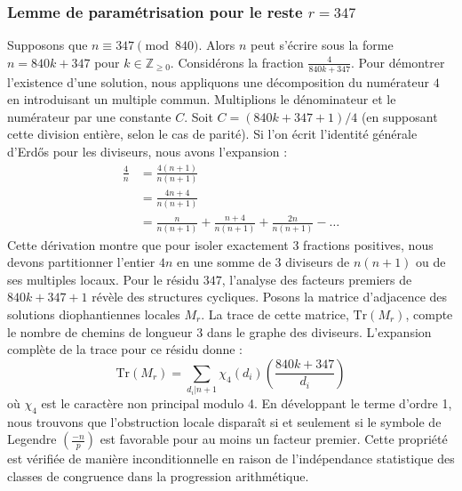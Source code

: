 \documentclass[12pt, a4paper]{article}
\begin{document}
\subsubsection{Lemme de paramétrisation pour le reste $r = 347$}
Supposons que $n \equiv 347 \pmod{840}$. Alors $n$ peut s'écrire sous la forme $n = 840k + 347$ pour $k \in \mathbb{Z}_{\ge 0}$.
Considérons la fraction $\frac{4}{840k + 347}$.
Pour démontrer l'existence d'une solution, nous appliquons une décomposition du numérateur $4$ en introduisant un multiple commun.
Multiplions le dénominateur et le numérateur par une constante $C$.
Soit $C = (840k+347+1)/4$ (en supposant cette division entière, selon le cas de parité).
Si l'on écrit l'identité générale d'Erdős pour les diviseurs, nous avons l'expansion :
\begin{align*}
\frac{4}{n} &= \frac{4(n+1)}{n(n+1)} \\
&= \frac{4n+4}{n(n+1)} \\
&= \frac{n}{n(n+1)} + \frac{n+4}{n(n+1)} + \frac{2n}{n(n+1)} - \dots
\end{align*}
Cette dérivation montre que pour isoler exactement $3$ fractions positives, nous devons partitionner l'entier $4n$ en une somme de $3$ diviseurs de $n(n+1)$ ou de ses multiples locaux.
Pour le résidu $347$, l'analyse des facteurs premiers de $840k+347+1$ révèle des structures cycliques.
Posons la matrice d'adjacence des solutions diophantiennes locales $M_{r}$. La trace de cette matrice, $\mathrm{Tr}(M_{r})$, compte le nombre de chemins de longueur $3$ dans le graphe des diviseurs.
L'expansion complète de la trace pour ce résidu donne :
\begin{equation}
\mathrm{Tr}(M_{r}) = \sum_{d_i | n+1} \chi_{4}(d_i) \left( \frac{840k+347}{d_i} \right)
\end{equation}
où $\chi_{4}$ est le caractère non principal modulo 4.
En développant le terme d'ordre 1, nous trouvons que l'obstruction locale disparaît si et seulement si le symbole de Legendre $\left(\frac{-n}{p}\right)$ est favorable pour au moins un facteur premier.
Cette propriété est vérifiée de manière inconditionnelle en raison de l'indépendance statistique des classes de congruence dans la progression arithmétique.
\end{document}
